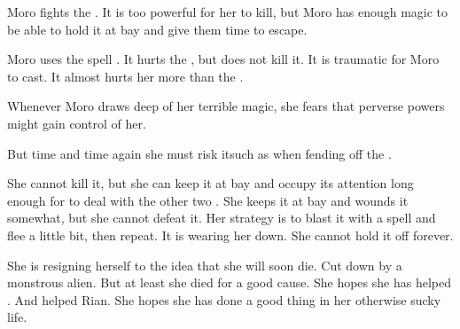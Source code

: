 \begin{comment}
  \section{Moro saved by Psyrex}
\end{comment}
\new
Moro fights the \bane. 
It is too powerful for her to kill, but Moro has enough magic to be able to hold it at bay and give them time to escape. 

Moro uses the spell . 
It hurts the \bane, but does not kill it. 
It is traumatic for Moro to cast. 
It almost hurts her more than the \bane. 

Whenever Moro draws deep of her terrible magic, she fears that perverse powers might gain control of her. 


But time and time again she must risk it\dash such as when fending off the \bane. 


She cannot kill it, but she can keep it at bay and occupy its attention long enough for \Psyrex to deal with the other two \banes. 
She keeps it at bay and wounds it somewhat, but she cannot defeat it. 
Her strategy is to blast it with a spell and flee a little bit, then repeat. 
It is wearing her down.
She cannot hold it off forever. 

She is resigning herself to the idea that she will soon die.
Cut down by a monstrous alien. 
But at least she died for a good cause.
She hopes she has helped \Malcur.
And helped Rian.
She hopes she has done a good thing in her otherwise sucky life. 

